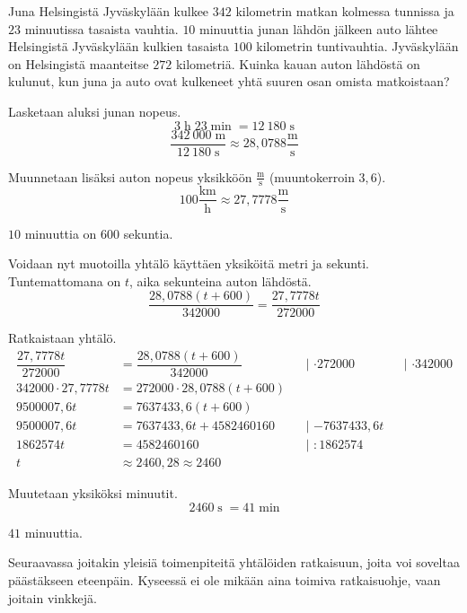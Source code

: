 \begin{esimerkki}
	Juna Helsingistä Jyväskylään kulkee $342$ kilometrin matkan kolmessa tunnissa ja $23$ minuutissa tasaista vauhtia.
	$10$ minuuttia junan lähdön jälkeen auto lähtee Helsingistä Jyväskylään kulkien tasaista $100$ kilometrin tuntivauhtia.
	Jyväskylään on Helsingistä maanteitse $272$ kilometriä.
	Kuinka kauan auton lähdöstä on kulunut, kun juna ja auto ovat kulkeneet yhtä suuren osan omista matkoistaan?
	\begin{esimratk}
		Lasketaan aluksi junan nopeus.
		\[ 3 \; \text{h} \; 23 \; \text{min} \; = 12~180 \; \text{s} \]
		\[ \dfrac{342~000 \; \text{m}}{12~180 \; \text{s}} \approx  28,0788 \frac{\text{m}}{\text{s}} \]
		
		Muunnetaan lisäksi auton nopeus yksikköön $\frac{\text{m}}{\text{s}}$ (muuntokerroin $3,6$).
		\[ 100 \frac{\text{km}}{\text{h}} \approx 27,7778 \frac{\text{m}}{\text{s}} \]
		
		$10$ minuuttia on $600$ sekuntia.
		
		Voidaan nyt muotoilla yhtälö käyttäen yksiköitä metri ja sekunti. Tuntemattomana on $t$, aika sekunteina auton lähdöstä.
		\[ \dfrac{28,0788(t+600)}{342000} = \dfrac{27,7778t}{272000} \]
		
		Ratkaistaan yhtälö.
		\begin{align*}
			\dfrac{27,7778t}{272000} &= \dfrac{28,0788(t+600)}{342000} &&\text{| $\cdot{272000}$} &&\text{| $\cdot{342000}$}  \\
			342000 \cdot 27,7778t &= 272000 \cdot 28,0788(t+600) \\
			9500007,6t &= 7637433,6(t+600) \\
			9500007,6t &= 7637433,6t + 4582460160 &&\text{| $-7637433,6t$} \\ 
			1862574t &= 4582460160 &&\text{| $:{1862574}$} \\
			t &\approx 2460,28 \approx 2460
		\end{align*}
		
		Muutetaan yksiköksi minuutit.
		\[ 2460 \; \text{s} \; = 41 \; \text{min} \]
	\end{esimratk}
	\begin{esimvast}
		$41$ minuuttia.
	\end{esimvast}
\end{esimerkki}


Seuraavassa joitakin yleisiä toimenpiteitä yhtälöiden ratkaisuun, joita voi soveltaa päästäkseen eteenpäin. Kyseessä ei ole mikään aina toimiva
ratkaisuohje, vaan joitain vinkkejä.


